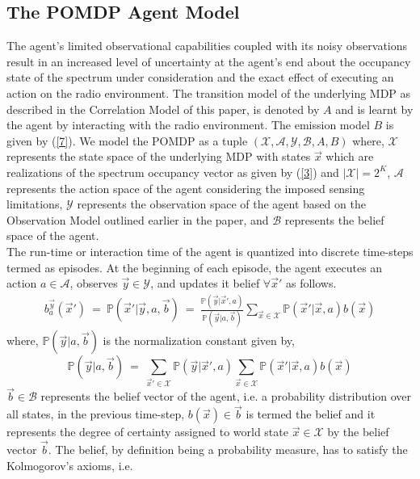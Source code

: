 \documentclass[12pt, draftcls, onecolumn]{IEEEtran}
\begin{document}
\subsection{The POMDP Agent Model}
The agent's limited observational capabilities coupled with its noisy observations result in an increased level of uncertainty at the agent's end about the occupancy state of the spectrum under consideration and the exact effect of executing an action on the radio environment. The transition model of the underlying MDP as described in the Correlation Model of this paper, is denoted by $A$ and is learnt by the agent by interacting with the radio environment. The emission model $B$ is given by (\ref{7}).
We model the POMDP as a tuple $(\mathcal{X},\mathcal{A},\mathcal{Y},\mathcal{B},A,B)$ where, $\mathcal{X}$ represents the state space of the underlying MDP with states $\vec{x}$ which are realizations of the spectrum occupancy vector as given by (\ref{3}) and $|\mathcal{X}|=2^K$, $\mathcal{A}$ represents the action space of the agent considering the imposed sensing limitations, $\mathcal{Y}$ represents the observation space of the agent based on the Observation Model outlined earlier in the paper, and $\mathcal{B}$ represents the belief space of the agent.
\\The run-time or interaction time of the agent is quantized into discrete time-steps termed as episodes. At the beginning of each episode, the agent executes an action $a \in \mathcal{A}$, observes $\vec{y} \in \mathcal{Y}$, and updates it belief $\forall \vec{x}'$ as follows.
\begin{equation}\label{8}
    \begin{aligned}
        b_a^{\vec{y}}(\vec{x}')\ =\ \mathbb{P}(\vec{x}'|\vec{y},a,\vec{b})\ =\ \frac{\mathbb{P}(\vec{y}|\vec{x}',a)}{\mathbb{P}(\vec{y}|a,\vec{b})}\sum_{\vec{x} \in \mathcal{X}}\mathbb{P}(\vec{x}'|\vec{x},a)b(\vec{x})
    \end{aligned}
\end{equation}
where, $\mathbb{P}(\vec{y}|a,\vec{b})$ is the normalization constant given by,
\begin{equation}\label{9}
        \mathbb{P}(\vec{y}|a,\vec{b})\ =\ \sum_{\vec{x}' \in \mathcal{X}}\mathbb{P}(\vec{y}|\vec{x}',a)\sum_{\vec{x} \in \mathcal{X}}\mathbb{P}(\vec{x}'|\vec{x},a)b(\vec{x})
\end{equation}
$\vec{b} \in \mathcal{B}$ represents the belief vector of the agent, i.e. a probability distribution over all states, in the previous time-step,
$b(\vec{x}) \in \vec{b}$ is termed the belief and it represents the degree of certainty assigned to world state $\vec{x} \in \mathcal{X}$ by the belief vector $\vec{b}$. The belief, by definition being a probability measure, has to satisfy the Kolmogorov's axioms, i.e.
\end{document}
